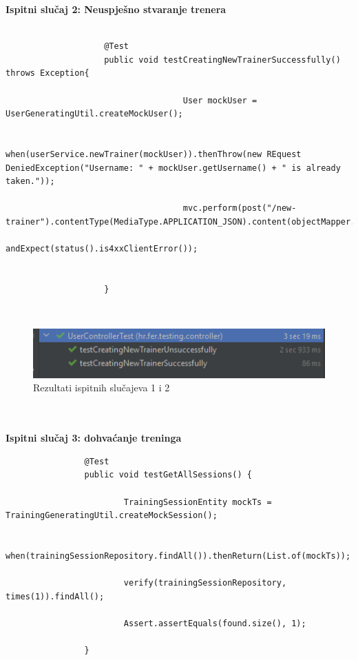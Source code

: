				\textbf{Ispitni slučaj 2: Neuspješno stvaranje trenera}\\\\
				
				\begin{verbatim}
					@Test
					public void testCreatingNewTrainerSuccessfully() throws Exception{
								
									User mockUser = UserGeneratingUtil.createMockUser();
									
									when(userService.newTrainer(mockUser)).thenThrow(new REquest DeniedException("Username: " + mockUser.getUsername() + " is already taken."));
									
									mvc.perform(post("/new-trainer").contentType(MediaType.APPLICATION_JSON).content(objectMapper.writeValueAsBytes(mockUser))).
											andExpect(status().is4xxClientError());
											
											
					}
				\end{verbatim}\\
		
				\begin{figure}[H]
				\includegraphics[scale=1]{dijagrami/2.png} %
				\centering
				\caption{Rezultati ispitnih slučajeva 1 i 2}
				\label{fig:ispitnislucaj12rez}
			\end{figure}\\\\
		
			
			\textbf{Ispitni slučaj 3: dohvaćanje treninga }\\
			
			\begin{verbatim}
				@Test
				public void testGetAllSessions() {
						
						TrainingSessionEntity mockTs = TrainingGeneratingUtil.createMockSession();
						
						when(trainingSessionRepository.findAll()).thenReturn(List.of(mockTs));
						
						verify(trainingSessionRepository, times(1)).findAll();
						
						Assert.assertEquals(found.size(), 1);
						
				}
			\end{verbatim}\\
			

